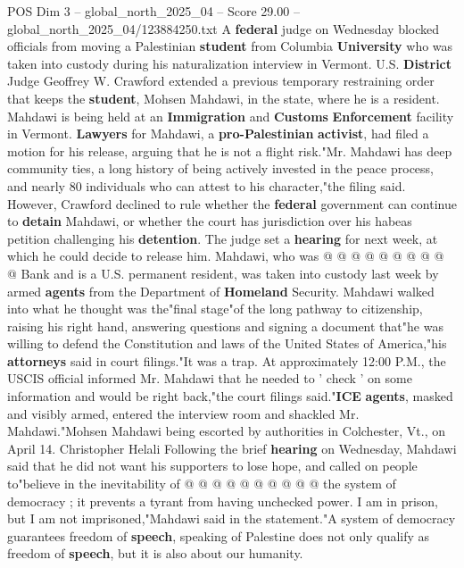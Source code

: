 \begin{textsample}{POS Dim 3 – global\_north\_2025\_04 – Score 29.00 – global\_north\_2025\_04/123884250.txt}  \label{ex:f3_pos_057}
A \textbf{federal} judge on Wednesday blocked officials from moving a Palestinian \textbf{student} from Columbia \textbf{University} who was taken into custody during his naturalization interview in Vermont.
U.S. \textbf{District} Judge Geoffrey W.
Crawford extended a previous temporary restraining order that keeps the \textbf{student}, Mohsen Mahdawi, in the state, where he is a resident.
Mahdawi is being held at an \textbf{Immigration} and \textbf{Customs} \textbf{Enforcement} facility in Vermont. \textbf{Lawyers} for Mahdawi, a \textbf{pro-Palestinian} \textbf{activist}, had filed a motion for his release, arguing that he is not a flight risk."Mr.
Mahdawi has deep community ties, a long history of being actively invested in the peace process, and nearly 80 individuals who can attest to his character,"the filing said.
However, Crawford declined to rule whether the \textbf{federal} government can continue to \textbf{detain} Mahdawi, or whether the court has jurisdiction over his habeas petition challenging his \textbf{detention}.
The judge set a \textbf{hearing} for next week, at which he could decide to release him.
Mahdawi, who was @ @ @ @ @ @ @ @ @ @ Bank and is a U.S. permanent resident, was taken into custody last week by armed \textbf{agents} from the Department of \textbf{Homeland} Security.
Mahdawi walked into what he thought was the"final stage"of the long pathway to citizenship, raising his right hand, answering questions and signing a document that"he was willing to defend the Constitution and laws of the United States of America,"his \textbf{attorneys} said in court filings."It was a trap.
At approximately 12:00 P.M., the USCIS official informed Mr.
Mahdawi that he needed to ' check ' on some information and would be right back,"the court filings said."\textbf{ICE} \textbf{agents}, masked and visibly armed, entered the interview room and shackled Mr.
Mahdawi."Mohsen Mahdawi being escorted by authorities in Colchester, Vt., on April 14.
Christopher Helali Following the brief \textbf{hearing} on Wednesday, Mahdawi said that he did not want his supporters to lose hope, and called on people to"believe in the inevitability of @ @ @ @ @ @ @ @ @ @ the system of democracy ; it prevents a tyrant from having unchecked power.
I am in prison, but I am not imprisoned,"Mahdawi said in the statement."A system of democracy guarantees freedom of \textbf{speech}, speaking of Palestine does not only qualify as freedom of \textbf{speech}, but it is also about our humanity.

\end{textsample}
